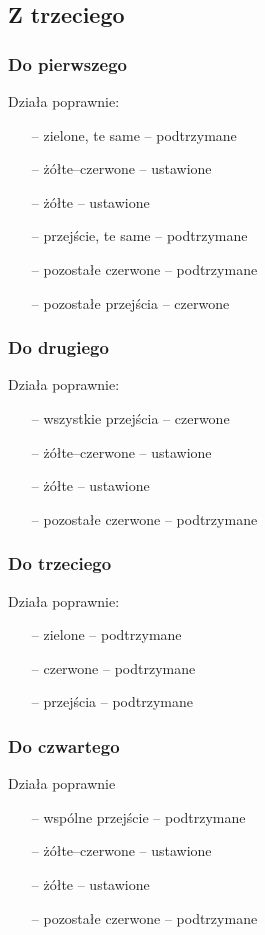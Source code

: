 \documentclass[a4paper, 12pt, titlepage]{article}
\begin{document}
		\subsection{Z trzeciego}
			\subsubsection{Do pierwszego}
				Działa poprawnie:
				\begin{itemize}
					\item[--] zielone, te same -- podtrzymane
					\item[--] żółte--czerwone -- ustawione
					\item[--] żółte -- ustawione
					\item[--] przejście, te same -- podtrzymane
					\item[--] pozostałe czerwone -- podtrzymane
					\item[--] pozostałe przejścia -- czerwone
				\end{itemize}
			\subsubsection{Do drugiego}
				Działa poprawnie:
				\begin{itemize}
					\item[--] wszystkie przejścia -- czerwone
					\item[--] żółte--czerwone -- ustawione
					\item[--] żółte -- ustawione
					\item[--] pozostałe czerwone -- podtrzymane
				\end{itemize}
			\subsubsection{Do trzeciego}
				Działa poprawnie:
				\begin{itemize}
					\item[--] zielone -- podtrzymane
					\item[--] czerwone -- podtrzymane
					\item[--] przejścia -- podtrzymane
				\end{itemize}
			\subsubsection{Do czwartego}
				Działa poprawnie
				\begin{itemize}
					\item[--] wspólne przejście -- podtrzymane
					\item[--] żółte--czerwone -- ustawione
					\item[--] żółte -- ustawione
					\item[--] pozostałe czerwone -- podtrzymane
				\end{itemize}
				\newpage
\end{document}
